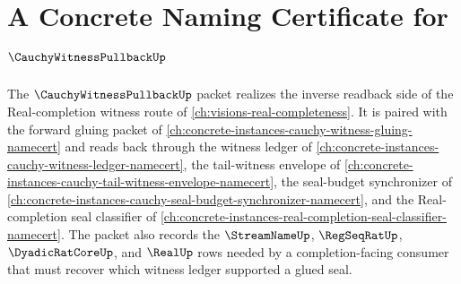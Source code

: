 \chapter{A Concrete Naming Certificate for $\CauchyWitnessPullbackUp$}
\label{ch:concrete-instances-cauchy-witness-pullback-namecert}

The $\CauchyWitnessPullbackUp$ packet realizes the inverse readback side of the Real-completion witness route of \autoref{ch:visions-real-completeness}. It is paired with the forward gluing packet of \autoref{ch:concrete-instances-cauchy-witness-gluing-namecert} and reads back through the witness ledger of \autoref{ch:concrete-instances-cauchy-witness-ledger-namecert}, the tail-witness envelope of \autoref{ch:concrete-instances-cauchy-tail-witness-envelope-namecert}, the seal-budget synchronizer of \autoref{ch:concrete-instances-cauchy-seal-budget-synchronizer-namecert}, and the Real-completion seal classifier of \autoref{ch:concrete-instances-real-completion-seal-classifier-namecert}. The packet also records the $\StreamNameUp$, $\RegSeqRatUp$, $\DyadicRatCoreUp$, and $\RealUp$ rows needed by a completion-facing consumer that must recover which witness ledger supported a glued seal.

